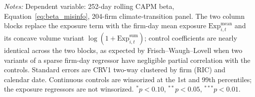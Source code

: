 \begin{table}[htbp]
\begin{threeparttable}
\begin{tablenotes}
\item \textit{Notes:} Dependent variable: 252-day rolling CAPM beta, Equation~\ref{eq:beta_misinfo}, 204-firm climate-transition panel. The two column blocks replace the exposure
term with the firm-day mean exposure $\mathrm{Exp}^{\text{mean}}_{i,t}$ and its
concave volume variant $\log(1+\mathrm{Exp}^{\text{sum}}_{i,t})$; control
coefficients are nearly identical across the two blocks, as expected by
Frisch--Waugh--Lovell when two variants of a sparse firm-day regressor have
negligible partial correlation with the controls. Standard errors are CRV1
two-way clustered by firm (RIC) and calendar date. Continuous controls are
winsorized at the 1st and 99th percentiles; the exposure regressors are not
winsorized. $^{*}p<0.10$, $^{**}p<0.05$, $^{***}p<0.01$.
\end{tablenotes}
\end{threeparttable}
\end{table}
